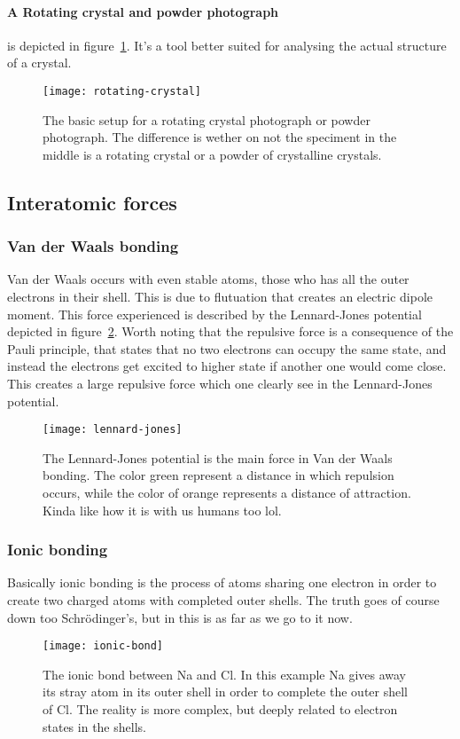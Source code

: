 \documentclass[11pt]{article}
\begin{document}
\newpage
\paragraph{A Rotating crystal and powder photograph} is depicted in figure~\ref{fig:rotating-crystal}. It's a tool better suited for analysing the actual structure of a crystal.
\begin{figure}[!h]
	\centering
	\texttt{[image: rotating-crystal]}
	\caption{The basic setup for a rotating crystal photograph or powder photograph. The difference is wether on not the speciment in the middle is a rotating crystal or a powder of crystalline crystals.}
	\label{fig:rotating-crystal}
\end{figure}

\newpage
\subsection{Interatomic forces}
\subsubsection{Van der Waals bonding}
Van der Waals occurs with even stable atoms, those who has all the outer electrons in their shell. This is due to flutuation that creates an electric dipole moment. This force experienced is described by the Lennard-Jones potential depicted in figure~\ref{fig:lennard-jones}. Worth noting that the repulsive force is a consequence of the Pauli principle, that states that no two electrons can occupy the same state, and instead the electrons get excited to higher state if another one would come close. This creates a large repulsive force which one clearly see in the Lennard-Jones potential.
\begin{figure}[!h]
	\centering
	\texttt{[image: lennard-jones]}
	\caption{The Lennard-Jones potential is the main force in Van der Waals bonding. The color green represent a distance in which repulsion occurs, while the color of orange represents a distance of attraction. Kinda like how it is with us humans too lol.}
	\label{fig:lennard-jones}
\end{figure}

\newpage
\subsubsection{Ionic bonding}
Basically ionic bonding is the process of atoms sharing one electron in order to create two charged atoms with completed outer shells. The truth goes of course down too Schrödinger's, but in this is as far as we go to it now.
\begin{figure}[!h]
	\centering
	\texttt{[image: ionic-bond]}
	\caption{The ionic bond between Na and Cl. In this example Na gives away its stray atom in its outer shell in order to complete the outer shell of Cl. The reality is more complex, but deeply related to electron states in the shells.}
	\label{fig:ionic-bond}
\end{figure}
\end{document}
